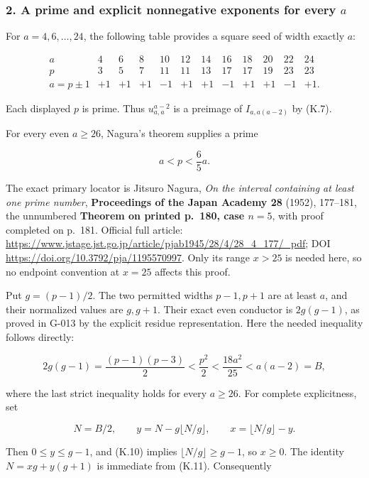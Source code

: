 \documentclass[
  10pt,
]{article}
\begin{document}
\subsubsection{\texorpdfstring{2. A prime and explicit nonnegative
exponents for every
\(a\)}{2. A prime and explicit nonnegative exponents for every a}}\label{a-prime-and-explicit-nonnegative-exponents-for-every-a}

For \(a=4,6,\ldots,24\), the following table provides a square seed of
width exactly \(a\):

\[
\begin{array}{c|rrrrrrrrrrr}
a&4&6&8&10&12&14&16&18&20&22&24\\\hline
p&3&5&7&11&11&13&17&17&19&23&23\\
a=p\pm1&+1&+1&+1&-1&+1&+1&-1&+1&+1&-1&+1.
\end{array}
\tag{K.8}
\]

Each displayed \(p\) is prime. Thus \(u_{a,a}^{a-2}\) is a preimage of
\(I_{a,a(a-2)}\) by (K.7).

For every even \(a\ge26\), Nagura's theorem supplies a prime

\[
a<p<\frac65a.
\tag{K.9}
\]

The exact primary locator is Jitsuro Nagura, \emph{On the interval
containing at least one prime number}, \textbf{Proceedings of the Japan
Academy 28} (1952), 177--181, the unnumbered \textbf{Theorem on printed
p.~180, case \(n=5\)}, with proof completed on p.~181. Official full
article:
\url{https://www.jstage.jst.go.jp/article/pjab1945/28/4/28_4_177/_pdf};
DOI \url{https://doi.org/10.3792/pja/1195570997}. Only its range
\(x>25\) is needed here, so no endpoint convention at \(x=25\) affects
this proof.

Put \(g=(p-1)/2\). The two permitted widths \(p-1,p+1\) are at least
\(a\), and their normalized values are \(g,g+1\). Their exact even
conductor is \(2g(g-1)\), as proved in G-013 by the explicit residue
representation. Here the needed inequality follows directly:

\[
2g(g-1)=\frac{(p-1)(p-3)}2
<\frac{p^2}2<\frac{18a^2}{25}<a(a-2)=B,
\tag{K.10}
\]

where the last strict inequality holds for every \(a\ge26\). For
complete explicitness, set

\[
N=B/2,\qquad y=N-g\lfloor N/g\rfloor,\qquad
x=\lfloor N/g\rfloor-y.
\tag{K.11}
\]

Then \(0\le y\le g-1\), and (K.10) implies
\(\lfloor N/g\rfloor\ge g-1\), so \(x\ge0\). The identity
\(N=xg+y(g+1)\) is immediate from (K.11). Consequently
\end{document}
